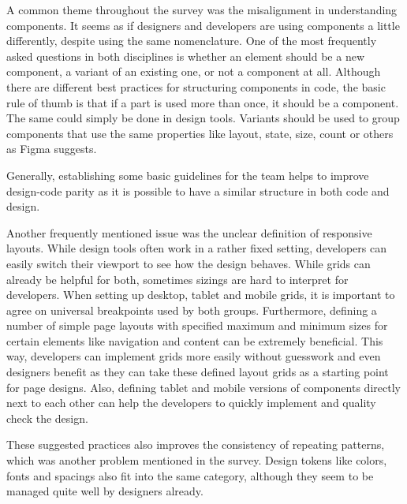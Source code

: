 
A common theme throughout the survey was the misalignment in understanding components. It seems as
if designers and developers are using components a little differently, despite using the same
nomenclature. One of the most frequently asked questions in both disciplines is whether an element
should be a new component, a variant of an existing one, or not a component at all. Although there
are different best practices for structuring components in code, the basic rule of thumb is that if
a part is used more than once, it should be a component. The same could simply be done in design
tools. Variants should be used to group components that use the same properties like layout, state,
size, count or others as Figma suggests. 

Generally, establishing some basic guidelines for the team helps to improve design-code parity as it
is possible to have a similar structure in both code and design.

Another frequently mentioned issue was the unclear definition of responsive layouts. While design
tools often work in a rather fixed setting, developers can easily switch their viewport to see how
the design behaves. While grids can already be helpful for both, sometimes sizings are hard to
interpret for developers. When setting up desktop, tablet and mobile grids, it is important to agree
on universal breakpoints used by both groups. Furthermore, defining a number of simple page layouts
with specified maximum and  minimum sizes for certain elements like navigation and content can be
extremely beneficial.
This way, developers can implement grids more easily without guesswork and even designers benefit as
they can take these defined layout grids as a starting point for page designs. Also, defining tablet
and mobile versions of components directly next to each other can help the developers to quickly
implement and quality check the design.

These suggested practices also improves the consistency of repeating patterns, which was another
problem mentioned in the survey. Design tokens like colors, fonts and spacings also fit into the
same category, although they seem to be managed quite well by designers already.

